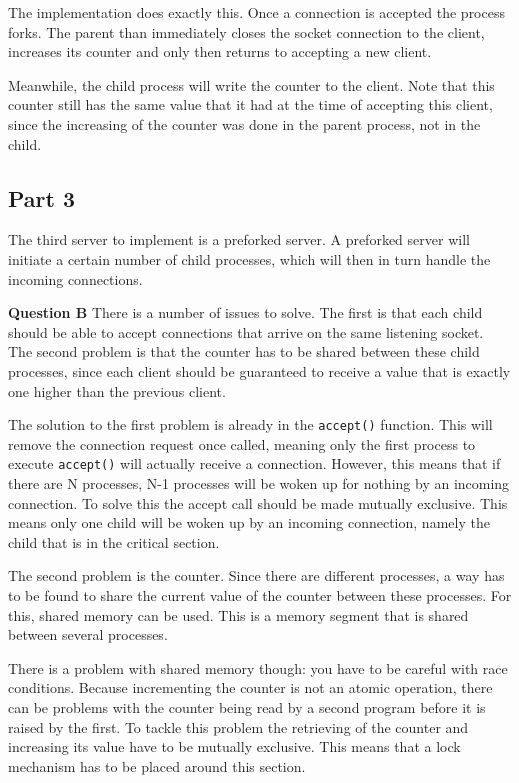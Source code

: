 \documentclass[a4paper]{article}
\begin{document}
The implementation does exactly this. Once a connection is accepted the process forks. The
parent than immediately closes the socket connection to the client, increases its counter
and only then returns to accepting a new client.

Meanwhile, the child process will write the counter to the client. Note that this counter 
still has the same value that it had at the time of accepting this client, since the
increasing of the counter was done in the parent process, not in the child.

\subsection{Part 3}

The third server to implement is a preforked server. A preforked server will initiate a
certain number of child processes, which will then in turn handle the incoming 
connections.

\textbf{Question B} There is a number of issues to solve. The first is that each child
should be able to accept connections that arrive on the same listening socket. The second
problem is that the counter has to be shared between these child processes, since each
client should be guaranteed to receive a value that is exactly one higher than the
previous client.

The solution to the first problem is already in the \texttt{accept()} function. This will
remove the connection request once called, meaning only the first process to execute
\texttt{accept()} will actually receive a connection. However, this means that if there
are N processes, N-1 processes will be woken up for nothing by an incoming connection.
To solve this the accept call should be made mutually exclusive. This means only one 
child will be woken up by an incoming connection, namely the child that is in the
critical section.

The second problem is the counter. Since there are different processes, a way has to be
found to share the current value of the counter between these processes. For this, shared
memory can be used. This is a memory segment that is shared between several processes.

There is a problem with shared memory though: you have to be careful with race conditions. 
Because incrementing the counter is not an atomic operation, there can be
problems with the counter being read by a second program before it is raised by the first.
To tackle this problem the retrieving of the counter and increasing its value have to be
mutually exclusive. This means that a lock mechanism has to be placed around this section.
\end{document}
